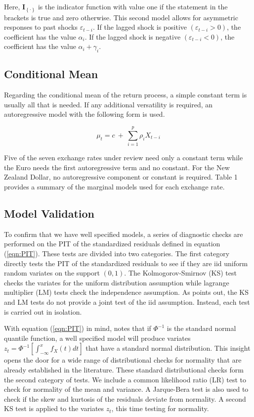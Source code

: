 \documentclass[12pt]{article}
\begin{document}
Here, $\mathbf{I}_{\left\{ \cdot \right\}}$ is the indicator function with value one if the statement in the brackets is true and zero otherwise. This second model allows for asymmetric responses to past shocks $\varepsilon_{t-i}$. If the lagged shock is positive $\left(\varepsilon_{t-i}>0\right)$, the coefficient has the value $\alpha_{i}$. If the lagged shock is negative $\left(\varepsilon_{t-i} < 0 \right)$, the coefficient has the value $\alpha_{i} + \gamma_{i}$.

\subsection{Conditional Mean}

Regarding the conditional mean of the return process, a simple constant term is usually all that is needed. If any additional versatility is required, an autoregressive model with the following form is used.

\begin{equation} \label{eqn:AR}
\mu_{t} = c ~+~ \sum_{i = 1}^{p} \rho_{i} X_{t - i}
\end{equation}

Five of the seven exchange rates under review need only a constant term while the Euro needs the first autoregressive term and no constant. For the New Zealand Dollar, no autoregressive component or constant is required. Table 1 provides a summary of the marginal models used for each exchange rate.

\subsection{Model Validation}

To confirm that we have well specified models, a series of diagnostic checks are performed on the PIT of the standardized residuals defined in equation (\ref{eqn:PIT}). These tests are divided into two categories. The first category directly tests the PIT of the standardized residuals to see if they are iid uniform random variates on the support $\left(0,1\right)$. The Kolmogorov-Smirnov (KS) test checks the variates for the uniform distribution assumption while lagrange multiplier (LM) tests check the independence assumption. As \cite{Berkowitz_2001} points out, the KS and LM tests do not provide a joint test of the iid assumption. Instead, each test is carried out in isolation.

With equation (\ref{eqn:PIT}) in mind, \cite{Berkowitz_2001} notes that if $\Phi^{-1}$ is the standard normal quantile function, a well specified model will produce variates $z_{t} = \Phi^{-1}\left[\int_{-\infty}^{x} f_{X}\left(t\right) dt \right]$ that have a standard normal distribution. This insight opens the door for a wide range of distributional checks for normality that are already established in the literature. These standard distributional checks form the second category of tests. We include a common likelihood ratio (LR) test to check for normality of the mean and variance. A Jarque-Bera test is also used to check if the skew and kurtosis of the residuals deviate from normality. A second KS test is applied to the variates $z_{t}$, this time testing for normality.
\end{document}
